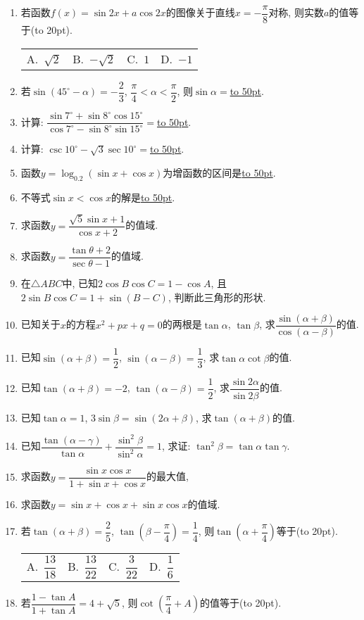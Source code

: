 \documentclass[10pt,a4paper]{article}
\newcommand{\blank}[1]{\underline{\hbox to #1pt{}}}
\newcommand{\bracket}[1]{(\hbox to #1pt{})}
\newcommand{\fourch}[4]{\par\begin{tabular}{p{.23\textwidth}p{.23\textwidth}p{.23\textwidth}p{.23\textwidth}}
A.~#1 &B.~#2& C.~#3& D.~#4
\end{tabular}}
\begin{document}
\begin{enumerate}[1.]
\fourch{$[-\sqrt 2,\sqrt 2]$}{$(-1,\dfrac{\sqrt 3-1}2)$}{$(-1,\dfrac{\sqrt 3-1}2]$}{$[-1,\dfrac{\sqrt 3-1}2]$}
\item 若函数$f(x)=\sin 2x+a\cos 2x$的图像关于直线$x=-\dfrac{\pi}8$对称, 则实数$a$的值等于\bracket{20}.
\fourch{$\sqrt 2$}{$-\sqrt 2$}{$1$}{$-1$}
\item 若$\sin (45^\circ -\alpha)=-\dfrac 23$, $\dfrac{\pi}4<\alpha <\dfrac{\pi}2$, 则$\sin \alpha =$\blank{50}.
\item 计算: $\dfrac{\sin 7^\circ +\sin 8^\circ \cos 15^\circ}{\cos 7^\circ -\sin 8^\circ \sin 15^\circ}=$\blank{50}.
\item 计算: $\csc 10^\circ -\sqrt 3\sec 10^\circ =$\blank{50}.
\item 函数$y=\log _{0.2}(\sin x+\cos x)$为增函数的区间是\blank{50}.
\item 不等式$\sin x<\cos x$的解是\blank{50}.
\item 求函数$y=\dfrac{\sqrt 5\sin x+1}{\cos x+2}$的值域.
\item 求函数$y=\dfrac{\tan \theta +2}{\sec \theta -1}$的值域.
\item 在$\triangle ABC$中, 已知$2\cos B\cos C=1-\cos A$, 且$2\sin B\cos C=1+\sin (B-C)$, 判断此三角形的形状.
\item 已知关于$x$的方程$x^2+px+q=0$的两根是$\tan \alpha$, $\tan \beta$, 求$\dfrac{\sin (\alpha +\beta)}{\cos (\alpha -\beta)}$的值.
\item 已知$\sin (\alpha +\beta)=\dfrac 12$, $\sin (\alpha -\beta)=\dfrac 13$, 求$\tan \alpha \cot \beta$的值.
\item 已知$\tan (\alpha +\beta)=-2$, $\tan (\alpha -\beta)=\dfrac 12$, 求$\dfrac{\sin 2\alpha}{\sin 2\beta}$的值.
\item 已知$\tan \alpha =1$, $3\sin \beta =\sin (2\alpha +\beta)$, 求$\tan (\alpha +\beta)$的值.
\item 已知$\dfrac{\tan (\alpha -\gamma)}{\tan \alpha}+\dfrac{\sin ^2\beta}{\sin ^2\alpha}=1$, 求证: $\tan ^2\beta =\tan \alpha \tan \gamma$.
\item 求函数$y=\dfrac{\sin x\cos x}{1+\sin x+\cos x}$的最大值,
\item 求函数$y=\sin x+\cos x+\sin x\cos x$的值域.
\item 若$\tan (\alpha +\beta)=\dfrac 25$, $\tan (\beta -\dfrac{\pi}4)=\dfrac 14$, 则$\tan (\alpha +\dfrac{\pi}4)$等于\bracket{20}.
\fourch{$\dfrac{13}{18}$}{$\dfrac{13}{22}$}{$\dfrac 3{22}$}{$\dfrac 16$}
\item 若$\dfrac{1-\tan A}{1+\tan A}=4+\sqrt 5$, 则$\cot (\dfrac{\pi}4+A)$的值等于\bracket{20}.

\end{enumerate}
\end{document}
